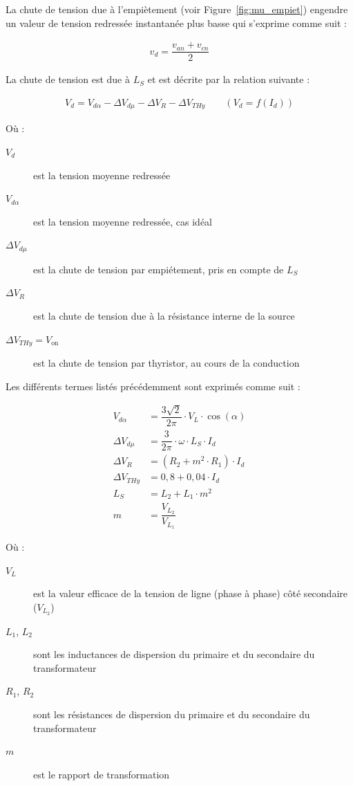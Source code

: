 \documentclass[a4paper, 11pt, openany, oneside, french]{article}
\begin{document}
La chute de tension due à l'empiètement (voir Figure~\ref{fig:mu_empiet}) engendre un valeur de tension redressée instantanée plus basse qui s'exprime comme suit :

\begin{align*}
    v_d = \dfrac{v_{an} + v_{cn}}{2}
\end{align*}

La chute de tension est due à $L_S$ et est décrite par la relation suivante :

\begin{align*}
    V_d = V_{d\alpha} - \Delta V_{d\mu} - \Delta V_R - \Delta V_{THy} \qquad \left(V_d = f\left(I_d\right)\right)
\end{align*}

Où :

\begin{description}
\item[$V_d$] est la tension moyenne redressée
\item[$V_{d\alpha}$] est la tension moyenne redressée, cas idéal
\item[$\Delta V_{d\mu}$] est la chute de tension par empiétement, pris en compte de $L_S$
\item[$\Delta V_R$] est la chute de tension due à la résistance interne de la source
\item[$\Delta V_{THy}  = V_{\text{on}}$] est la chute de tension par thyristor, au cours de la conduction
\end{description}

Les différents termes listés précédemment sont exprimés comme suit :

\begin{align*}
    V_{d\alpha} &= \dfrac{3\sqrt{2}}{2\pi} \cdot V_L \cdot \cos{\left(\alpha \right)}\\
    \Delta V_{d\mu} &= \dfrac{3}{2\pi} \cdot \omega \cdot L_S \cdot I_d\\
    \Delta V_R &= \left(R_2 + m^2 \cdot R_1 \right)\cdot I_d\\
    \Delta V_{THy} &= 0,8 + 0,04 \cdot I_d\\
    L_S &= L_2 + L_1 \cdot m^2\\
    m &= \dfrac{V_{L_2}}{V_{L_1}}
\end{align*}

Où :

\begin{description}
\item[$V_L$] est la valeur efficace de la tension de ligne (phase à phase) côté secondaire ($V_{L_2}$)
\item[$L_1$, $L_2$] sont les inductances de dispersion du primaire et du secondaire du transformateur
\item[$R_1$, $R_2$] sont les résistances de dispersion du primaire et du secondaire du transformateur
\item[$m$] est le rapport de transformation
\end{description}
\end{document}
